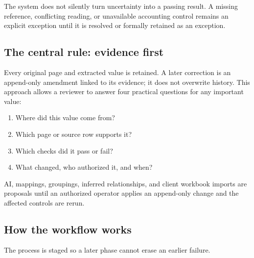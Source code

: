 \documentclass[
]{article}
\providecommand{\tightlist}{%
  \setlength{\itemsep}{0pt}\setlength{\parskip}{0pt}}
\begin{document}
The system does not silently turn uncertainty into a passing result. A
missing reference, conflicting reading, or unavailable accounting
control remains an explicit exception until it is resolved or formally
retained as an exception.

\subsection{The central rule: evidence
first}\label{the-central-rule-evidence-first}

Every original page and extracted value is retained. A later correction
is an append-only amendment linked to its evidence; it does not
overwrite history. This approach allows a reviewer to answer four
practical questions for any important value:

\begin{enumerate}
\def\labelenumi{\arabic{enumi}.}
\tightlist
\item
  Where did this value come from?
\item
  Which page or source row supports it?
\item
  Which checks did it pass or fail?
\item
  What changed, who authorized it, and when?
\end{enumerate}

AI, mappings, groupings, inferred relationships, and client workbook
imports are proposals until an authorized operator applies an
append-only change and the affected controls are rerun.

\subsection{How the workflow works}\label{how-the-workflow-works}

The process is staged so a later phase cannot erase an earlier failure.
\end{document}
